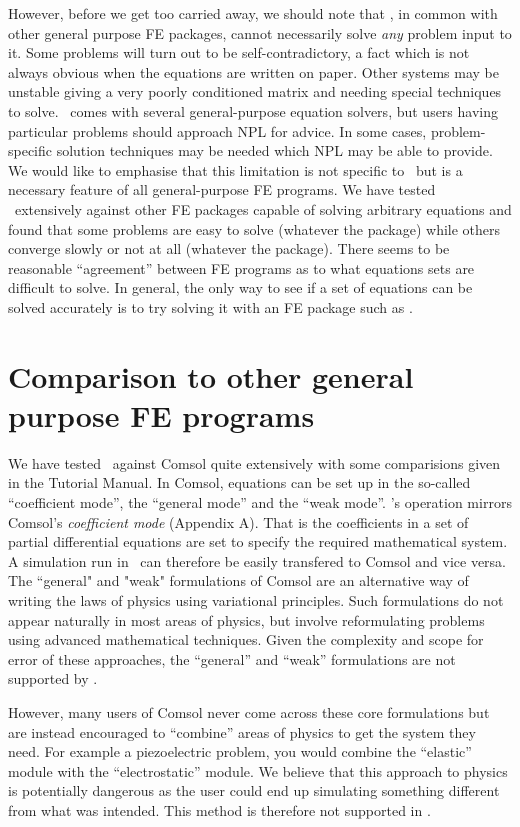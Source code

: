 \documentclass[a4paper,twoside,11pt]{book}
\begin{document}
However, before we get too carried away, we should note that \zinc, in
common with other general purpose FE packages, cannot necessarily
solve \emph{any} problem input to it. Some problems will turn out to
be self-contradictory, a fact which is not always obvious when the
equations are written on paper. Other systems may be unstable giving a
very poorly conditioned matrix and needing special techniques to
solve. \zinc\ comes with several general-purpose equation solvers, but
users having particular problems should approach NPL for advice. In
some cases, problem-specific solution techniques may be needed which
NPL may be able to provide. We would like to emphasise that this
limitation is not specific to \zinc\ but is a necessary feature of all
general-purpose FE programs. We have tested \zinc\ extensively against
other FE packages capable of solving arbitrary equations and found
that some problems are easy to solve (whatever the package) while
others converge slowly or not at all (whatever the package). There
seems to be reasonable ``agreement'' between FE programs as to what
equations sets are difficult to solve. In general, the only way to see
if a set of equations can be solved accurately is to try solving it with
an FE package such as \zinc.

\section{Comparison to other general purpose FE programs}

We have tested \zinc\ against Comsol quite extensively with some
comparisions given in the Tutorial Manual. In Comsol, equations can be
set up in the so-called ``coefficient mode'', the ``general mode'' and the
``weak mode''. \zinc's operation mirrors Comsol's \emph{coefficient
  mode} (Appendix A). That is the coefficients in a set of partial
differential equations are set to specify the required mathematical
system. A simulation run in \zinc\ can therefore be easily transfered
to Comsol and vice versa. The
``general" and "weak" formulations of Comsol are an alternative way of
writing the laws of physics using variational principles. Such
formulations do not appear naturally in most areas of physics, but
involve reformulating problems using advanced mathematical
techniques. Given the complexity and scope for error of these
approaches, the ``general'' and ``weak'' formulations are not
supported by \zinc.

However, many users of Comsol never come across these core
formulations but are instead encouraged to ``combine'' areas of physics
to get the system they need. For example a piezoelectric problem, you
would combine the ``elastic'' module with the ``electrostatic'' module. We
believe that this approach to physics is
potentially dangerous as the user could end up
simulating something different from what was intended. This method is
therefore not supported in \zinc.
\end{document}
